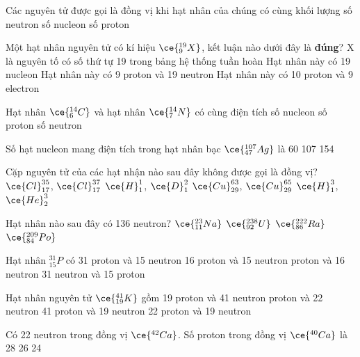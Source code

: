 \begin{ex}
	Các nguyên tử được gọi là đồng vị khi hạt nhân của chúng có cùng
	\choice
	{khối lượng}
	{số neutron}
	{số nucleon}
	{\True số proton}
	\loigiai{}
\end{ex}
\begin{ex}
	Một hạt nhân nguyên tử có kí hiệu $\ce{_9^{19}X}$, kết luận nào dưới đây là \textbf{đúng}?
	\choice
	{X là nguyên tố có số thứ tự 19 trong bảng hệ thống tuần hoàn}
	{\True Hạt nhân này có 19 nucleon}
	{Hạt nhân này có 9 proton và 19 neutron}
	{Hạt nhân này có 10 proton và 9 electron}
	\loigiai{}
\end{ex}
\begin{ex}
	Hạt nhân $\ce{_6^{14}C}$ và hạt nhân $\ce{_7^{14}N}$ có cùng
	\choice
	{điện tích}
	{\True số nucleon}
	{số proton}
	{số neutron}
	\loigiai{}
\end{ex}
\begin{ex}
	Số hạt nucleon mang điện tích trong hạt nhân bạc $\ce{_{47}^{107}Ag}$ là
	\choice
	{}
	{60}
	{107}
	{154}
	\loigiai{}
\end{ex}

\begin{ex}
	Cặp nguyên tử của các hạt nhận nào sau đây không được gọi là đồng vị?
	\choice
	{$\ce{Cl}_{17}^{35} $, $\ce{Cl}_{17}^{37}$}
	{$\ce{H}_{1}^{1} $, $\ce{D}_{1}^{2}$}
	{$\ce{Cu}_{29}^{63} $, $\ce{Cu}_{29}^{65}$}
	{\True $\ce{H}_{1}^{3}$, $\ce{He}_{2}^{3}$}
	\loigiai{}
\end{ex}
\begin{ex}
	Hạt nhân nào sau đây có 136 neutron?
	\choice
	{$\ce{_{11}^{23}Na}$}
	{$\ce{_{92}^{238}U}$}
	{\True$\ce{_{86}^{222}Ra}$}
	{$\ce{_{84}^{209}Po}$}
	\loigiai{}
\end{ex}%
\begin{ex}
	Hạt nhân ${_{15}^{31}P}$ có
	\choice
	{31 proton và 15 neutron}
	{16 proton và 15 neutron}
	{ proton và 16 neutron}
	{31 neutron và 15 proton}
	\loigiai{}
\end{ex}
\begin{ex}
	Hạt nhân nguyên tử $\ce{_{19}^{41}K}$ gồm
	\choice
	{19 proton và 41 neutron}
	{ proton và 22 neutron}
	{41 proton và 19 neutron}
	{22 proton và 19 neutron}
	\loigiai{}
\end{ex}
\begin{ex}
	Có 22 neutron trong đồng vị $\ce{^{42}Ca}$. Số proton trong đồng vị $\ce{^{40}Ca}$ là
	\choice
	{28}
	{26}
	{24}
	{}
	\loigiai{}
\end{ex}


